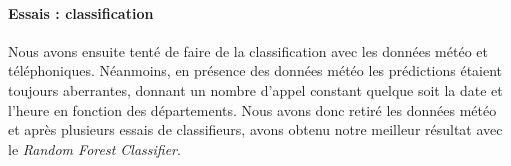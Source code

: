 \documentclass[a4paper,11pt,french]{article}
\begin{document}
    \paragraph{Essais : classification} Nous avons ensuite tenté de faire de la classification avec les données météo et téléphoniques. Néanmoins, en présence des données météo les prédictions étaient toujours aberrantes, donnant un nombre d'appel constant quelque soit la date et l'heure en fonction des départements. Nous avons donc retiré les données météo et après plusieurs essais de classifieurs, avons obtenu notre meilleur résultat avec le \emph{Random Forest Classifier}.
\end{document}
